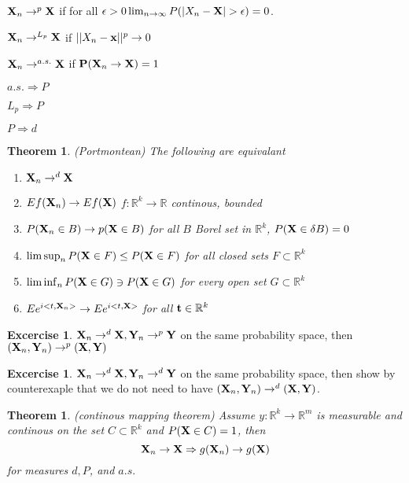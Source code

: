 \documentclass[12pt,a4paper]{amsart}
\theoremstyle{definition} %
\newtheorem{excercise}[defn]{Excercise}
\theoremstyle{plain} %
\newtheorem{theorem}[defn]{Theorem}
\newcommand{\R}{\mathbb R}
\begin{document}
${\bf X}_n \rightarrow^p {\bf X}$ if for all $\epsilon > 0 \lim_{n \rightarrow \infty} P(|X_n - {\bf X}| > \epsilon) = 0$.
 
${\bf X}_n \rightarrow^{L_p} {\bf X}$ if $||X_n - {\bf x}||^p \rightarrow 0$

${\bf X}_n \rightarrow^{a.s.} {\bf X}$ if ${\bf P}({\bf X}_n \rightarrow {\bf X}) = 1$

$a.s. \Rightarrow P$

$L_p \Rightarrow P$

$P \Rightarrow d$

\begin{theorem} (Portmontean)
The following are equivalant
\begin{enumerate}
\item ${\bf X}_n \rightarrow^d {\bf X}$
\item $E f({\bf X}_n) \rightarrow Ef({\bf X})$ $f: \R^k \rightarrow \R$ continous, bounded 
\item $P({\bf X}_n \in B) \rightarrow p({\bf X} \in B)$ for all $B$ Borel set in $\R^k$, $P({\bf X} \in \delta B) = 0$
\item $\limsup_n{P({\bf X} \in F)} \leq P({\bf X} \in F)$ for all closed sets $F \subset \R^k$
\item $\liminf_n{P({\bf X} \in G)} \ni P({\bf X} \in G)$ for every open set $G \subset \R^k$
\item $E e^{i<t, {\bf X}_n>} \rightarrow E e^{i<t, {\bf X}>}$ for all ${\bf t} \in \R^k$
\end{enumerate}
\end{theorem}

\begin{excercise}
${\bf X}_n \rightarrow^d {\bf X}, {\bf Y}_n \rightarrow^p {\bf Y}$ on the same probability space, then $({\bf X}_n, {\bf Y}_n) \rightarrow^p ({\bf X}, {\bf Y})$
\end{excercise}

\begin{excercise}
${\bf X}_n \rightarrow^d {\bf X}, {\bf Y}_n \rightarrow^d {\bf Y}$ on the same probability space, then show by counterexaple that we do not need to have $({\bf X}_n, {\bf Y}_n) \rightarrow^d ({\bf X}, {\bf Y})$.
\end{excercise}

\begin{theorem} (continous mapping theorem)
Assume $y: \R^k \rightarrow \R^m$ is measurable and continous on the set $C \subset \R^k$ and $P({\bf X} \in C) = 1$, then 
$${\bf X}_n \rightarrow {\bf X} \Rightarrow g({\bf X}_n) \rightarrow g({\bf X})$$ for measures $d, P$, and $a.s.$
\end{theorem}
\end{document}

